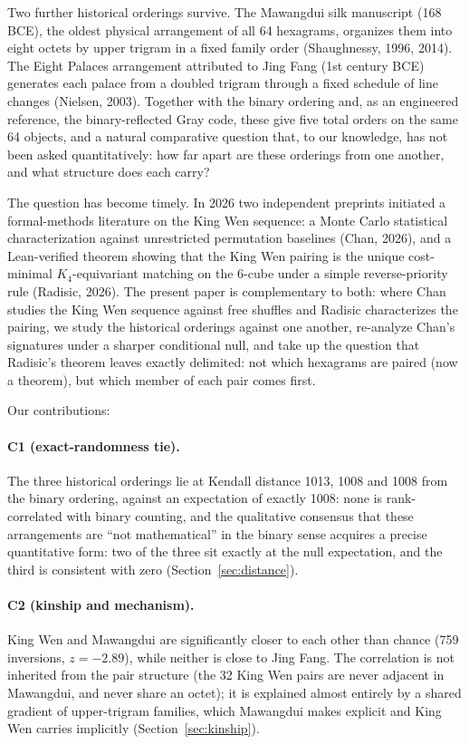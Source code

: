 \documentclass[11pt]{article}
\begin{document}
Two further historical orderings survive. The Mawangdui silk manuscript (168 BCE), the oldest physical arrangement of all 64 hexagrams, organizes them into eight octets by upper trigram in a fixed family order (Shaughnessy, 1996, 2014). The Eight Palaces arrangement attributed to Jing Fang (1st century BCE) generates each palace from a doubled trigram through a fixed schedule of line changes (Nielsen, 2003). Together with the binary ordering and, as an engineered reference, the binary-reflected Gray code, these give five total orders on the same 64 objects, and a natural comparative question that, to our knowledge, has not been asked quantitatively: how far apart are these orderings from one another, and what structure does each carry?

The question has become timely. In 2026 two independent preprints initiated a formal-methods literature on the King Wen sequence: a Monte Carlo statistical characterization against unrestricted permutation baselines (Chan, 2026), and a Lean-verified theorem showing that the King Wen pairing is the unique cost-minimal $K_4$-equivariant matching on the 6-cube under a simple reverse-priority rule (Radisic, 2026). The present paper is complementary to both: where Chan studies the King Wen sequence against free shuffles and Radisic characterizes the pairing, we study the historical orderings against one another, re-analyze Chan's signatures under a sharper conditional null, and take up the question that Radisic's theorem leaves exactly delimited: not which hexagrams are paired (now a theorem), but which member of each pair comes first.

Our contributions:

\paragraph{C1 (exact-randomness tie).} The three historical orderings lie at Kendall distance 1013, 1008 and 1008 from the binary ordering, against an expectation of exactly 1008: none is rank-correlated with binary counting, and the qualitative consensus that these arrangements are ``not mathematical'' in the binary sense acquires a precise quantitative form: two of the three sit exactly at the null expectation, and the third is consistent with zero (Section~\ref{sec:distance}).

\paragraph{C2 (kinship and mechanism).} King Wen and Mawangdui are significantly closer to each other than chance (759 inversions, $z = -2.89$), while neither is close to Jing Fang. The correlation is not inherited from the pair structure (the 32 King Wen pairs are never adjacent in Mawangdui, and never share an octet); it is explained almost entirely by a shared gradient of upper-trigram families, which Mawangdui makes explicit and King Wen carries implicitly (Section~\ref{sec:kinship}).
\end{document}
